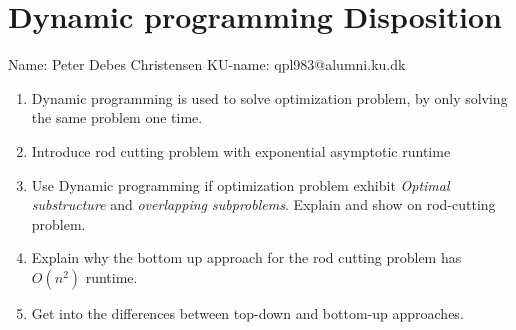 \documentclass{report}
\begin{document}
\section*{Dynamic programming Disposition}
Name: Peter Debes Christensen\hfill
KU-name: qpl983@alumni.ku.dk \\[\baselineskip]
%

\begin{enumerate}
	\item Dynamic programming is used to solve optimization problem, by only solving the same problem one time.
	\item Introduce rod cutting problem with exponential asymptotic runtime
	\item Use Dynamic programming if optimization problem exhibit \emph{Optimal substructure} and \emph{overlapping subproblems}. Explain and show on rod-cutting problem.
	\item Explain why the bottom up approach for the rod cutting problem has $O(n^2)$ runtime.
	\item Get into the differences between top-down and bottom-up approaches.
\end{enumerate}
\end{document}
